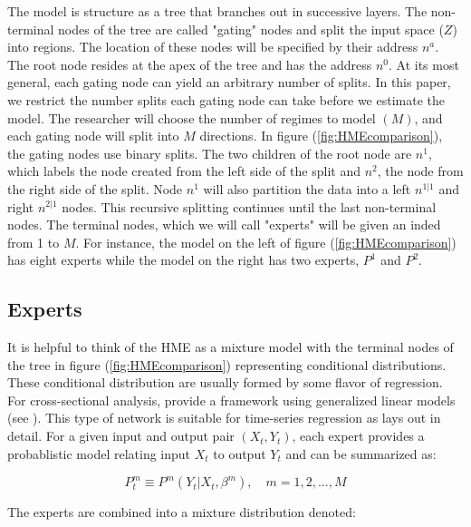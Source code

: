 \documentclass[12pt]{article}
\begin{document}
The model is structure as a tree that branches out in successive
layers. The non-terminal nodes of the tree are called "gating" nodes and
split the input space ($Z$) into regions. The location of these nodes will be
specified by their address $n^{a}$. The root node resides at the apex of the tree
and has the address $n^{0}$. At its most general, each gating node can yield an
arbitrary number of splits. In this paper, we restrict the number splits each
gating node can take before we estimate the model. The researcher will choose the
number of regimes to model $(M)$, and each gating node will split into $M$
directions. In figure (\ref{fig:HMEcomparison}), the gating nodes use binary
splits. The two children of the root node are $n^{1}$, which labels the
node created from the left side of the split and $n^{2}$, the node from
the right side of the split. Node $n^{1}$ will also partition the data
into a left $n^{1|1}$ and right $n^{2|1}$ nodes. This recursive splitting
continues until the last non-terminal nodes. The terminal nodes, which we will
call "experts" will be given an inded from 1 to $M$. For instance, the model on 
the left of figure (\ref{fig:HMEcomparison}) has eight experts while the model on
the right has two experts, $P^{1}$ and $P^{2}$.





\subsection{Experts}
It is helpful to think of the HME as a mixture model with the terminal
nodes of the tree in figure (\ref{fig:HMEcomparison}) representing conditional
distributions. These conditional distribution are usually formed by some flavor of
regression. For cross-sectional analysis, \cite{JordanJacobs1993} provide
a framework using generalized linear models (see \cite{GLM1972}). This type
of network is suitable for time-series regression as \cite{HuertaJiangTanner2003}
lays out in detail. For a given input and output pair $(X_{t}, Y_{t})$,
each expert provides a probablistic model relating input $X_{t}$ to output
$Y_{t}$ and can be summarized as:

\begin{equation} \label{eq:ConditionalDistribution}
  P^{m}_{t} \equiv P^{m}(Y_{t}|X_{t}, \beta^{m}), \quad m = 1,2,...,M
\end{equation}

The experts are combined into a mixture distribution denoted:
\end{document}
